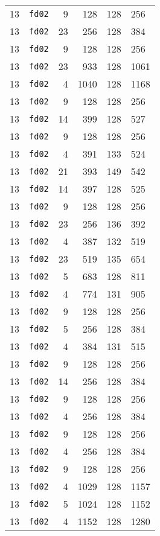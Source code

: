 \documentclass{article}
\begin{document}
\begin{table}[h!]
\begin{tabular}{llrrrl}
    13 & \texttt{fd02} & 9 & 128 & 128 & 256 \\
    13 & \texttt{fd02} & 23 & 256 & 128 & 384 \\
    13 & \texttt{fd02} & 9 & 128 & 128 & 256 \\
    13 & \texttt{fd02} & 23 & 933 & 128 & 1061 \\
    13 & \texttt{fd02} & 4 & 1040 & 128 & 1168 \\
    13 & \texttt{fd02} & 9 & 128 & 128 & 256 \\
    13 & \texttt{fd02} & 14 & 399 & 128 & 527 \\
    13 & \texttt{fd02} & 9 & 128 & 128 & 256 \\
    13 & \texttt{fd02} & 4 & 391 & 133 & 524 \\
    13 & \texttt{fd02} & 21 & 393 & 149 & 542 \\
    13 & \texttt{fd02} & 14 & 397 & 128 & 525 \\
    13 & \texttt{fd02} & 9 & 128 & 128 & 256 \\
    13 & \texttt{fd02} & 23 & 256 & 136 & 392 \\
    13 & \texttt{fd02} & 4 & 387 & 132 & 519 \\
    13 & \texttt{fd02} & 23 & 519 & 135 & 654 \\
    13 & \texttt{fd02} & 5 & 683 & 128 & 811 \\
    13 & \texttt{fd02} & 4 & 774 & 131 & 905 \\
    13 & \texttt{fd02} & 9 & 128 & 128 & 256 \\
    13 & \texttt{fd02} & 5 & 256 & 128 & 384 \\
    13 & \texttt{fd02} & 4 & 384 & 131 & 515 \\
    13 & \texttt{fd02} & 9 & 128 & 128 & 256 \\
    13 & \texttt{fd02} & 14 & 256 & 128 & 384 \\
    13 & \texttt{fd02} & 9 & 128 & 128 & 256 \\
    13 & \texttt{fd02} & 4 & 256 & 128 & 384 \\
    13 & \texttt{fd02} & 9 & 128 & 128 & 256 \\
    13 & \texttt{fd02} & 4 & 256 & 128 & 384 \\
    13 & \texttt{fd02} & 9 & 128 & 128 & 256 \\
    13 & \texttt{fd02} & 4 & 1029 & 128 & 1157 \\
    13 & \texttt{fd02} & 5 & 1024 & 128 & 1152 \\
    13 & \texttt{fd02} & 4 & 1152 & 128 & 1280 \\

\end{tabular}
\end{table}
\end{document}
